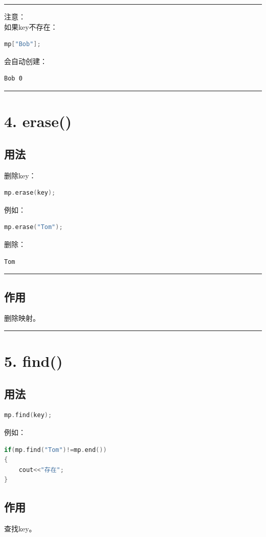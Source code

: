 \documentclass[10pt,twocolumn]{extarticle}
\begin{document}
\noindent\rule{\linewidth}{0.4pt}

注意：\\
如果key不存在：
\begin{lstlisting}[language=C++]
mp["Bob"];
\end{lstlisting}
会自动创建：
\begin{lstlisting}
Bob 0
\end{lstlisting}

\noindent\rule{\linewidth}{0.4pt}

\section{4. erase()}

\subsection{用法}
删除key：
\begin{lstlisting}[language=C++]
mp.erase(key);
\end{lstlisting}
例如：
\begin{lstlisting}[language=C++]
mp.erase("Tom");
\end{lstlisting}
删除：
\begin{lstlisting}
Tom
\end{lstlisting}

\noindent\rule{\linewidth}{0.4pt}

\subsection{作用}
删除映射。

\noindent\rule{\linewidth}{0.4pt}

\section{5. find()}

\subsection{用法}
\begin{lstlisting}[language=C++]
mp.find(key);
\end{lstlisting}
例如：
\begin{lstlisting}[language=C++]
if(mp.find("Tom")!=mp.end())
{
    cout<<"存在";
}
\end{lstlisting}

\subsection{作用}
查找key。
\end{document}
